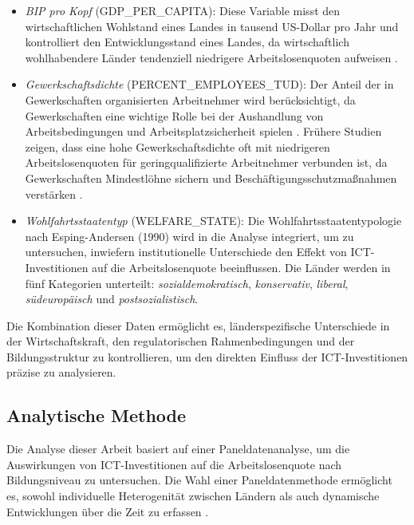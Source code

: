 \begin{itemize}
    \item \textit{\ac{BIP} pro Kopf} (GDP\_PER\_CAPITA): Diese Variable misst den wirtschaftlichen Wohlstand 
    eines Landes in tausend US-Dollar pro Jahr und kontrolliert den Entwicklungsstand eines Landes, da 
    wirtschaftlich wohlhabendere Länder tendenziell niedrigere Arbeitslosenquoten aufweisen 
    \parencite{oecd2022gdp}.
    \item \textit{Gewerkschaftsdichte} (PERCENT\_EMPLOYEES\_TUD): Der Anteil der in Gewerkschaften 
    organisierten Arbeitnehmer wird berücksichtigt, da Gewerkschaften eine wichtige Rolle bei der Aushandlung 
    von Arbeitsbedingungen und Arbeitsplatzsicherheit spielen \parencite{oecd2022tud}. Frühere Studien 
    zeigen, dass eine hohe Gewerkschaftsdichte oft mit niedrigeren Arbeitslosenquoten für geringqualifizierte 
    Arbeitnehmer verbunden ist, da Gewerkschaften Mindestlöhne sichern und Beschäftigungsschutzmaßnahmen 
    verstärken \parencite[S. 61]{nickell1997unemployment}.
    \item \textit{Wohlfahrtsstaatentyp} (WELFARE\_STATE): Die Wohlfahrtsstaatentypologie nach Esping-Andersen 
    (1990) \parencite{espingandersen1990thethree} wird in die Analyse integriert, um zu untersuchen, 
    inwiefern institutionelle Unterschiede den Effekt von \ac{ICT}-Investitionen auf die Arbeitslosenquote 
    beeinflussen. Die Länder werden in fünf Kategorien unterteilt: \textit{sozialdemokratisch}, 
    \textit{konservativ}, \textit{liberal}, \textit{südeuropäisch} und \textit{postsozialistisch}.
\end{itemize}

Die Kombination dieser Daten ermöglicht es, länderspezifische Unterschiede in der Wirtschaftskraft, den 
regulatorischen Rahmenbedingungen und der Bildungsstruktur zu kontrollieren, um den direkten Einfluss der 
\ac{ICT}-Investitionen präzise zu analysieren.

\subsection{Analytische Methode}

Die Analyse dieser Arbeit basiert auf einer Paneldatenanalyse, um die Auswirkungen von \ac{ICT}-Investitionen 
auf die Arbeitslosenquote nach Bildungsniveau zu untersuchen. Die Wahl einer Paneldatenmethode ermöglicht 
es, sowohl individuelle Heterogenität zwischen Ländern als auch dynamische Entwicklungen über die Zeit zu 
erfassen \parencite{wooldridge2010econometric}.

